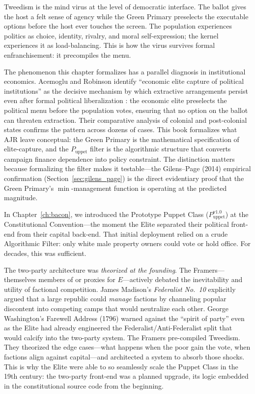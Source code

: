 Tweedism is the mind virus at the level of democratic interface. The ballot gives the host a felt sense of agency while the Green Primary preselects the executable options before the host ever touches the screen. The population experiences politics as choice, identity, rivalry, and moral self-expression; the kernel experiences it as load-balancing. This is how the virus survives formal enfranchisement: it precompiles the menu.

The phenomenon this chapter formalizes has a parallel diagnosis in institutional economics. Acemoglu and Robinson identify ``economic elite capture of political institutions'' as the decisive mechanism by which extractive arrangements persist even after formal political liberalization \cite{acemoglu_robinson}: the economic elite preselects the political menu before the population votes, ensuring that no option on the ballot can threaten extraction. Their comparative analysis of colonial and post-colonial states confirms the pattern across dozens of cases. This book formalizes what AJR leave conceptual: the Green Primary is the mathematical specification of elite-capture, and the $P_{\text{uppet}}$ filter is the algorithmic structure that converts campaign finance dependence into policy constraint. The distinction matters because formalizing the filter makes it testable---the Gilens--Page (2014) empirical confirmation (Section~\ref{sec:gilens_page}) is the direct evidentiary proof that the Green Primary's $\min$-management function is operating at the predicted magnitude.

In Chapter~\ref{ch:bacon}, we introduced the Prototype Puppet Class ($P_{\text{uppet}}^{\text{v1.0}}$) at the Constitutional Convention---the moment the Elite separated their political front-end from their capital back-end. That initial deployment relied on a crude Algorithmic Filter: only white male property owners could vote or hold office. For decades, this was sufficient.

The two-party architecture was \textit{theorized at the founding}. The Framers---themselves members of or proxies for $E$---actively debated the inevitability and utility of factional competition. James Madison's \textit{Federalist No.~10} explicitly argued that a large republic could \textit{manage} factions by channeling popular discontent into competing camps that would neutralize each other. George Washington's Farewell Address (1796) warned against the ``spirit of party'' even as the Elite had already engineered the Federalist/Anti-Federalist split that would calcify into the two-party system. The Framers pre-compiled Tweedism. They theorized the edge cases---what happens when the poor gain the vote, when factions align against capital---and architected a system to absorb those shocks. This is why the Elite were able to so seamlessly scale the Puppet Class in the 19th century: the two-party front-end was a planned upgrade, its logic embedded in the constitutional source code from the beginning.

